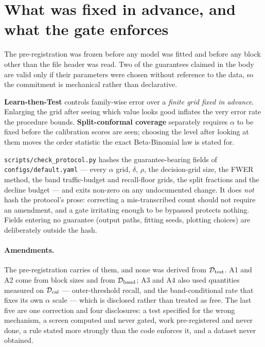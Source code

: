 \section{What was fixed in advance, and what the gate enforces}

The pre-registration was frozen before any model was fitted and before any block other than
the file header was read. Two of the guarantees claimed in the body are valid only if their
parameters were chosen without reference to the data, so the commitment is mechanical rather
than declarative.

\textbf{Learn-then-Test} controls family-wise error over a \emph{finite grid fixed in
advance}. Enlarging the grid after seeing which value looks good inflates the very error rate
the procedure bounds. \textbf{Split-conformal coverage} separately requires
$\alpha$ to be fixed before the calibration scores are seen; choosing the level after looking
at them moves the order statistic the exact Beta-Binomial law is stated for.

\texttt{scripts/check\_protocol.py} hashes the guarantee-bearing fields of
\texttt{configs/default.yaml} --- every $\alpha$ grid, $\delta$, $\rho$, the decision-grid
size, the FWER method, the band traffic-budget and recall-floor grids, the split fractions and
the decline budget --- and exits non-zero on any undocumented change. It does \emph{not} hash
the protocol's prose: correcting a mis-transcribed count should not require an amendment, and
a gate irritating enough to be bypassed protects nothing. Fields entering no guarantee
(output paths, fitting seeds, plotting choices) are deliberately outside the hash.

\paragraph{Amendments.} The pre-registration carries \ClaimProtocolAmendments{} of them, and
none was derived from $\mathcal{D}_{\mathrm{test}}$. A1 and A2 come from block sizes and from $\mathcal{D}_{\mathrm{band}}$; A3 and A4
also used quantities measured on $\mathcal{D}_{\mathrm{cal}}$ --- outer-threshold recall, and the band-conditional
rate that fixes its own $\alpha$ scale --- which is disclosed rather than treated as free. The
last five are one correction and four disclosures: a test specified for the wrong mechanism, a
screen computed and never gated, work pre-registered and never done, a rule stated more
strongly than the code enforces it, and a dataset never obtained.

